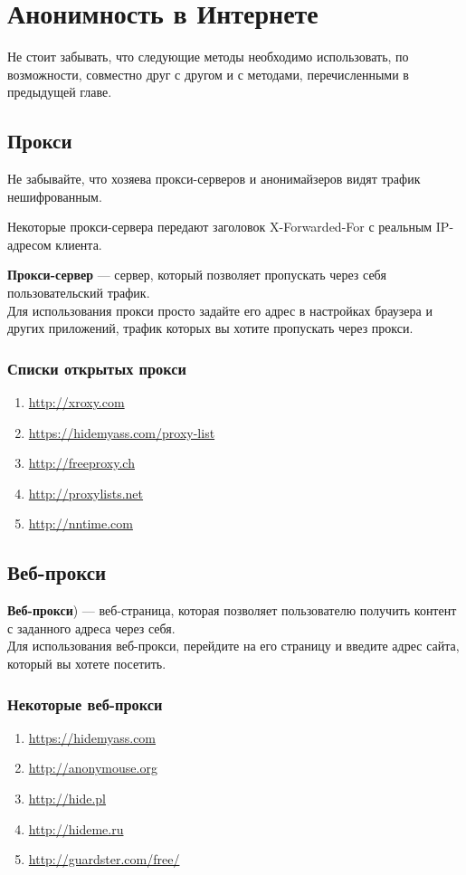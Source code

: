 \chapter{Анонимность в Интернете}
\begin{important}
Не стоит забывать, что следующие методы необходимо использовать, по возможности, совместно друг с другом и с методами, перечисленными в предыдущей главе.
\end{important}

\section{Прокси}
\begin{important}
Не забывайте, что хозяева прокси-серверов и анонимайзеров видят трафик нешифрованным.
\end{important}
\begin{important}
Некоторые прокси-сервера передают заголовок X-Forwarded-For с реальным IP-адресом клиента.
\end{important}
\textbf{Прокси-сервер} --- сервер, который позволяет пропускать через себя пользовательский трафик.\\
Для использования прокси просто задайте его адрес в настройках браузера и других приложений, трафик которых вы хотите пропускать через прокси.
\subsection{Списки открытых прокси}
\begin{enumerate}
\item \url{http://xroxy.com}
\item \url{https://hidemyass.com/proxy-list}
\item \url{http://freeproxy.ch}
\item \url{http://proxylists.net}
\item \url{http://nntime.com}
\end{enumerate}

\section{Веб-прокси}
\textbf{Веб-прокси}) --- веб-страница, которая позволяет пользователю получить контент с заданного адреса через себя.\\
Для использования веб-прокси, перейдите на его страницу и введите адрес сайта, который вы хотете посетить.
\subsection{Некоторые веб-прокси}
\begin{enumerate}
\item \url{https://hidemyass.com}
\item \url{http://anonymouse.org}
\item \url{http://hide.pl}
\item \url{http://hideme.ru}
\item \url{http://guardster.com/free/}
\end{enumerate}


